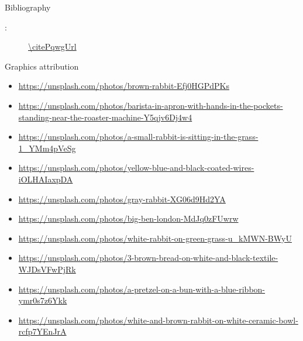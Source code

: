 
\begin{frame}{Bibliography}
  \begin{description}
    \item[\citePqwg:] \url{\citePqwgUrl}
  \end{description}
\end{frame}

\begin{frame}{Graphics attribution}
  \tiny
  \begin{itemize}
    \item \url{https://unsplash.com/photos/brown-rabbit-Efj0HGPdPKs}
    \item \url{https://unsplash.com/photos/barista-in-apron-with-hands-in-the-pockets-standing-near-the-roaster-machine-Y5qjv6Dj4w4}
    \item \url{https://unsplash.com/photos/a-small-rabbit-is-sitting-in-the-grass-1_YMm4pVeSg}
    \item \url{https://unsplash.com/photos/yellow-blue-and-black-coated-wires-iOLHAIaxpDA}
    \item \url{https://unsplash.com/photos/gray-rabbit-XG06d9Hd2YA}
    \item \url{https://unsplash.com/photos/big-ben-london-MdJq0zFUwrw}
    \item \url{https://unsplash.com/photos/white-rabbit-on-green-grass-u_kMWN-BWyU}
    \item \url{https://unsplash.com/photos/3-brown-bread-on-white-and-black-textile-WJDsVFwPjRk}
    \item \url{https://unsplash.com/photos/a-pretzel-on-a-bun-with-a-blue-ribbon-ymr0s7z6Ykk}
    \item \url{https://unsplash.com/photos/white-and-brown-rabbit-on-white-ceramic-bowl-rcfp7YEnJrA}
  \end{itemize}
\end{frame}
